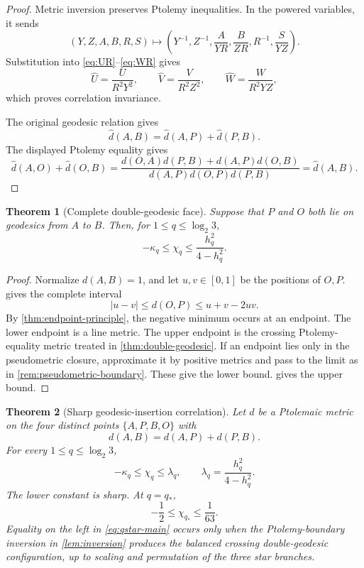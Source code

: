 \documentclass[11pt]{amsart}
\newtheorem{theorem}{Theorem}[section]
\theoremstyle{definition}
\theoremstyle{remark}
\newcommand{\qstar}{q_*}
\begin{document}
\begin{proof}
Metric inversion preserves Ptolemy inequalities. In the powered variables, it sends
\[
 (Y,Z,A,B,R,S)
 \longmapsto
 \left(
 Y^{-1},Z^{-1},\frac{A}{YR},\frac{B}{ZR},R^{-1},\frac{S}{YZ}
 \right).
\]
Substitution into \eqref{eq:UR}--\eqref{eq:WR} gives
\[
 \widehat U=\frac{U}{R^2Y^2},
 \qquad
 \widehat V=\frac{V}{R^2Z^2},
 \qquad
 \widehat W=\frac{W}{R^2YZ},
\]
which proves correlation invariance.

The original geodesic relation gives
\[
 \widehat d(A,B)=\widehat d(A,P)+\widehat d(P,B).
\]
The displayed Ptolemy equality gives
\[
 \widehat d(A,O)+\widehat d(O,B)
 =\frac{d(O,A)d(P,B)+d(A,P)d(O,B)}
 {d(A,P)d(O,P)d(P,B)}
 =\widehat d(A,B).
\]
\end{proof}

\begin{theorem}[Complete double-geodesic face]\label{thm:full-double-geodesic}
Suppose that \(P\) and \(O\) both lie on geodesics from \(A\) to \(B\). Then, for \(1\leq q\leq\log_2 3\),
\begin{equation}\label{eq:full-double-bound}
 -\kappa_q\leq\chi_q\leq\frac{h_q^2}{4-h_q^2}.
\end{equation}
\end{theorem}

\begin{proof}
Normalize \(d(A,B)=1\), and let \(u,v\in[0,1]\) be the positions of \(O,P\).  gives the complete interval
\[
 |u-v|\leq d(O,P)\leq u+v-2uv.
\]
By \cref{thm:endpoint-principle}, the negative minimum occurs at an endpoint. The lower endpoint is a line metric. The upper endpoint is the crossing Ptolemy-equality metric treated in \cref{thm:double-geodesic}. If an endpoint lies only in the pseudometric closure, approximate it by positive metrics and pass to the limit as in \cref{rem:pseudometric-boundary}. These give the lower bound.  gives the upper bound.
\end{proof}

\begin{theorem}[Sharp geodesic-insertion correlation]\label{thm:geodesic-insertion}
Let \(d\) be a Ptolemaic metric on the four distinct points
\(\{A,P,B,O\}\) with
\[
 d(A,B)=d(A,P)+d(P,B).
\]
For every \(1\leq q\leq\log_2 3\),
\begin{equation}\label{eq:geodesic-main}
 -\kappa_q
 \leq\chi_q
 \leq\lambda_q,
 \qquad
 \lambda_q=\frac{h_q^2}{4-h_q^2}.
\end{equation}
The lower constant is sharp. At \(q=\qstar\),
\begin{equation}\label{eq:qstar-main}
 -\frac12\leq\chi_{\qstar}\leq\frac1{63}.
\end{equation}
Equality on the left in \eqref{eq:qstar-main} occurs only when the Ptolemy-boundary inversion in \cref{lem:inversion} produces the balanced crossing double-geodesic configuration, up to scaling and permutation of the three star branches.
\end{theorem}
\end{document}
